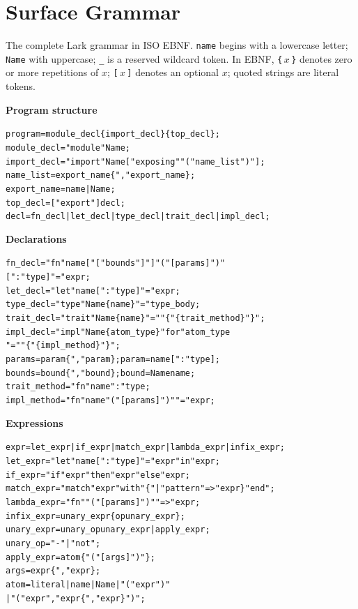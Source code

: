 \documentclass[10pt,a4paper]{article}
\theoremstyle{plain}
\theoremstyle{definition}
\theoremstyle{remark}
\begin{document}
\section{Surface Grammar}
\label{sec:grammar}

The complete Lark grammar in ISO EBNF\@.  \texttt{name} begins with a
lowercase letter; \texttt{Name} with uppercase; \texttt{\_} is a reserved
wildcard token.  In EBNF, \texttt{\{}\,$x$\,\texttt{\}} denotes zero or more
repetitions of $x$; \texttt{[}\,$x$\,\texttt{]} denotes an optional $x$;
quoted strings are literal tokens.

\medskip\noindent\textbf{Program structure}
{\small\begin{alltt}
program     = module_decl \{ import_decl \} \{ top_decl \} ;
module_decl = "module" Name ;
import_decl = "import" Name [ "exposing" "(" name_list ")" ] ;
name_list   = export_name \{ "," export_name \} ;
export_name = name | Name ;
top_decl    = [ "export" ] decl ;
decl        = fn_decl | let_decl | type_decl | trait_decl | impl_decl ;
\end{alltt}}

\medskip\noindent\textbf{Declarations}
{\small\begin{alltt}
fn_decl      = "fn" name [ "[" bounds "]" ] "(" [ params ] ")"
               [ ":" type ] "=" expr ;
let_decl     = "let" name [ ":" type ] "=" expr ;
type_decl    = "type" Name \{ name \} "=" type_body ;
trait_decl   = "trait" Name \{ name \} "=" "\{" \{ trait_method \} "\}" ;
impl_decl    = "impl" Name \{ atom_type \} "for" atom_type
               "=" "\{" \{ impl_method \} "\}" ;
params       = param \{ "," param \} ;  param = name [ ":" type ] ;
bounds       = bound \{ "," bound \} ;  bound = Name name ;
trait_method = "fn" name ":" type ;
impl_method  = "fn" name "(" [ params ] ")" "=" expr ;
\end{alltt}}

\medskip\noindent\textbf{Expressions}
{\small\begin{alltt}
expr        = let_expr | if_expr | match_expr | lambda_expr | infix_expr ;
let_expr    = "let" name [ ":" type ] "=" expr "in" expr ;
if_expr     = "if" expr "then" expr "else" expr ;
match_expr  = "match" expr "with" \{ "|" pattern "=>" expr \} "end" ;
lambda_expr = "fn" "(" [ params ] ")" "=>" expr ;
infix_expr  = unary_expr \{ op unary_expr \} ;
unary_expr  = unary_op unary_expr | apply_expr ;
unary_op    = "-" | "not" ;
apply_expr  = atom \{ "(" [ args ] ")" \} ;
args        = expr \{ "," expr \} ;
atom        = literal | name | Name | "(" expr ")"
            | "(" expr "," expr \{ "," expr \} ")" ;
\end{alltt}}
\end{document}
